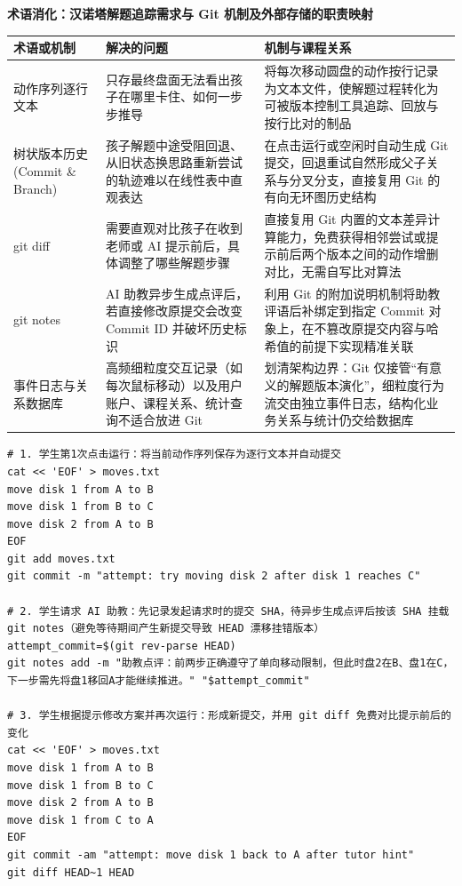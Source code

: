 \documentclass[UTF8,a4paper,11pt,fontset=fandol]{ctexart}
\begin{document}
\par{}\textbf{术语消化：汉诺塔解题追踪需求与 Git 机制及外部存储的职责映射}

\begin{center}\small\begin{tabularx}{\linewidth}{YYY}

\toprule

术语或机制 & 解决的问题 & 机制与课程关系\\\midrule

动作序列逐行文本 & 只存最终盘面无法看出孩子在哪里卡住、如何一步步推导 & 将每次移动圆盘的动作按行记录为文本文件，使解题过程转化为可被版本控制工具追踪、回放与按行比对的制品\\[3pt]

树状版本历史 (Commit \& Branch) & 孩子解题中途受阻回退、从旧状态换思路重新尝试的轨迹难以在线性表中直观表达 & 在点击运行或空闲时自动生成 Git 提交，回退重试自然形成父子关系与分叉分支，直接复用 Git 的有向无环图历史结构\\[3pt]

git diff & 需要直观对比孩子在收到老师或 AI 提示前后，具体调整了哪些解题步骤 & 直接复用 Git 内置的文本差异计算能力，免费获得相邻尝试或提示前后两个版本之间的动作增删对比，无需自写比对算法\\[3pt]

git notes & AI 助教异步生成点评后，若直接修改原提交会改变 Commit ID 并破坏历史标识 & 利用 Git 的附加说明机制将助教评语后补绑定到指定 Commit 对象上，在不篡改原提交内容与哈希值的前提下实现精准关联\\[3pt]

事件日志与关系数据库 & 高频细粒度交互记录（如每次鼠标移动）以及用户账户、课程关系、统计查询不适合放进 Git & 划清架构边界：Git 仅接管“有意义的解题版本演化”，细粒度行为流交由独立事件日志，结构化业务关系与统计仍交给数据库\\[3pt]

\bottomrule\end{tabularx}\end{center}

\begin{lstlisting}[basicstyle={\ttfamily\small\linespread{1}\selectfont},captionpos=t,caption={将汉诺塔解题尝试与助教点评映射到 Git 操作的伪代码示例}]
# 1. 学生第1次点击运行：将当前动作序列保存为逐行文本并自动提交
cat << 'EOF' > moves.txt
move disk 1 from A to B
move disk 1 from B to C
move disk 2 from A to B
EOF
git add moves.txt
git commit -m "attempt: try moving disk 2 after disk 1 reaches C"

# 2. 学生请求 AI 助教：先记录发起请求时的提交 SHA，待异步生成点评后按该 SHA 挂载 git notes（避免等待期间产生新提交导致 HEAD 漂移挂错版本）
attempt_commit=$(git rev-parse HEAD)
git notes add -m "助教点评：前两步正确遵守了单向移动限制，但此时盘2在B、盘1在C，下一步需先将盘1移回A才能继续推进。" "$attempt_commit"

# 3. 学生根据提示修改方案并再次运行：形成新提交，并用 git diff 免费对比提示前后的变化
cat << 'EOF' > moves.txt
move disk 1 from A to B
move disk 1 from B to C
move disk 2 from A to B
move disk 1 from C to A
EOF
git commit -am "attempt: move disk 1 back to A after tutor hint"
git diff HEAD~1 HEAD
\end{lstlisting}
\end{document}
